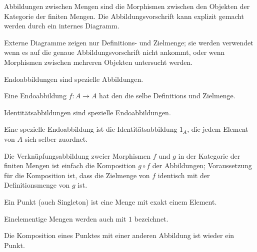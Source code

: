 \documentclass[parskip=half]{scrreprt}
\begin{document}

Abbildungen zwischen Mengen sind die Morphismen zwischen den Objekten
der Kategorie der finiten Mengen.
Die Abbildungsvorschrift kann explizit gemacht werden durch ein internes 
Diagramm. 


Externe Diagramme zeigen nur Definitions- und Zielmenge; 
sie werden verwendet wenn es auf die genaue Abbildungsvorschrift nicht 
ankommt, oder wenn Morphismen zwischen mehreren Objekten untersucht werden.

Endoabbildungen sind spezielle Abbildungen.
\begin{definition}[Endoabbildung]
Eine Endoabbildung  $f: A → A$ hat den
die selbe Definitions und Zielmenge.
\end{definition}

Identitätsabbildungen sind spezielle Endoabbildungen.

\begin{definition}[Identitätsabbildung]
Eine spezielle Endoabbildung ist die Identitätsabbildung $1_A$,
 die jedem Element von $A$ sich selber 
zuordnet.
\end{definition}

Die Verknüpfungsabbildung zweier Morphismen $f$ und $g$ in der Kategorie der 
finiten Mengen ist einfach die Komposition $g∘f$ der Abbildungen;
Voraussetzung für die Komposition ist, dass die Zielmenge von $f$ identisch
mit der Definitionsmenge von $g$ ist.


\begin{definition}[Punkt]%
Ein Punkt (auch Singleton) ist eine Menge mit exakt einem Element.
\end{definition}

\begin{remark}
Einelementige Mengen werden auch mit $1$ bezeichnet.
\end{remark}

\begin{theorem}
Die Komposition eines Punktes mit einer anderen Abbildung ist wieder ein Punkt.
\end{theorem}


\end{document}
